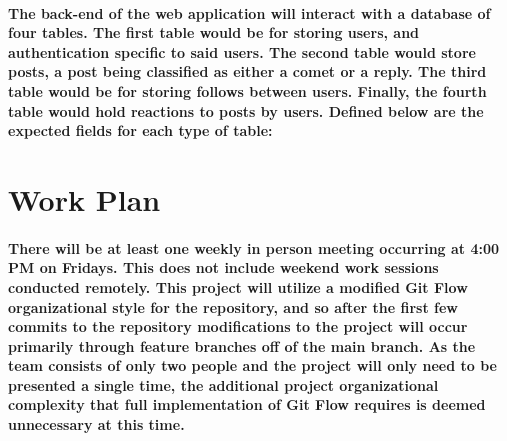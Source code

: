 \documentclass{article}
\begin{document}
    \paragraph{The back-end of the web application will interact with a database of four tables. The first table would be for storing users, and authentication specific to said users. The second table would store posts, a post being classified as either a comet or a reply. The third table would be for storing follows between users. Finally, the fourth table would hold reactions to posts by users. Defined below are the expected fields for each type of table:}
    \begin{center}
    \end{center}
    
    \newpage
    
    \section{Work Plan}
    \paragraph{There will be at least one weekly in person meeting occurring at 4:00 PM on Fridays. This does not include weekend work sessions conducted remotely. This project will utilize a modified Git Flow organizational style for the repository, and so after the first few commits to the repository modifications to the project will occur primarily through feature branches off of the main branch. As the team consists of only two people and the project will only need to be presented a single time, the additional project organizational complexity that full implementation of Git Flow requires is deemed unnecessary at this time.}
\end{document}
